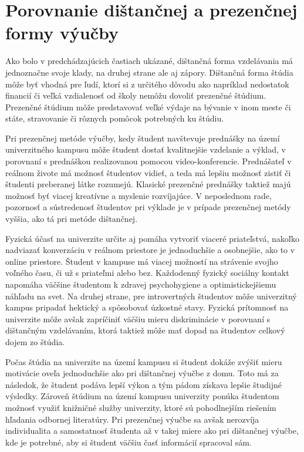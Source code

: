 \documentclass[10pt,slovak,a4paper]{article}
\begin{document}
\section{Porovnanie dištančnej a prezenčnej formy výučby}
	Ako bolo v predchádzajúcich častiach ukázané, dištančná forma vzdelávania má jednoznačne svoje klady, na druhej strane ale aj zápory. Dištančná forma štúdia môže byť vhodná pre ľudí, ktorí si z určitého dôvodu ako napríklad nedostatok financií či veľká vzdialenosť od školy nemôžu dovoliť prezenčné štúdium. Prezenčné štúdium môže predstavovať veľké výdaje na bývanie v inom meste či státe, stravovanie či rôznych pomôcok potrebných ku štúdiu.

	Pri prezenčnej metóde výučby, kedy študent navštevuje prednášky na území univerzitného kampusu môže študent dostať kvalitnejšie vzdelanie a výklad, v porovnaní s prednáškou realizovanou pomocou video-konferencie. Prednášateľ v reálnom živote má možnosť študentov vidieť, a teda má lepšiu možnosť zistiť či študenti preberanej látke rozumejú. Klasické prezenčné prednášky taktiež majú možnosť byť viacej kreatívne a myslenie rozvíjajúce. V neposlednom rade, pozornosť a sústredenosť študentov pri výklade je v prípade prezenčnej metódy vyššia, ako tá pri metóde dištančnej. 

	Fyzická účasť na univerzite určite aj pomáha vytvoriť viaceré priateľstvá, nakoľko nadviazať konverzáciu v reálnom priestore je jednoduchšie a osobnejšie, ako to v online priestore. Študent v kampuse má viacej možností na strávenie svojho voľného času, či už s priateľmi alebo bez. Každodenný fyzický sociálny kontakt napomáha väčšine študentom k zdravej psychohygiene a optimistickejšiemu náhľadu na svet. Na druhej strane, pre introvertných študentov môže univerzitný kampus pripadať hektický a spôsobovať úzkostné stavy. Fyzická prítomnosť na univerzite môže avšak zapríčiniť väčšiu mieru diskriminácie v porovnaní s dištančným vzdelávaním, ktorá taktiež môže mať dopad na študentov celkový dojem zo štúdia. 

	Počas štúdia na univerzite na území kampusu si študent dokáže zvýšiť mieru motivácie oveľa jednoduchšie ako pri dištančnej výučbe z domu. Toto má za následok, že študent podáva lepší výkon a tým pádom získava lepšie študijné výsledky. Zároveň štúdium na území kampusu univerzity ponúka študentom možnosť využiť knižničné služby univerzity, ktoré sú pohodlnejším riešením hľadania odbornej literatúry. Pri prezenčnej výučbe sa avšak nerozvíja individualita a samostatnosť študenta až v takej miere ako pri dištančnej výučbe, kde je potrebné, aby si študent väčšiu časť informácií spracoval sám.
\end{document}

